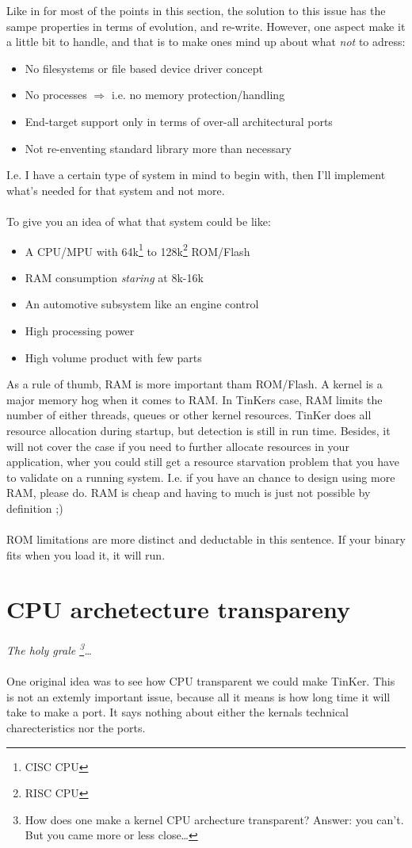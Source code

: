 Like in for most of the points in this section, the solution to this issue has the sampe properties in terms of evolution, and re-write. However, one aspect make it a little bit to handle, and that is to make ones mind up about what \textit{not} to adress:
\begin{itemize}
	\item No filesystems or file based device driver concept
	\item No processes $\Rightarrow$ i.e. no memory protection/handling
	\item End-target support only in terms of over-all architectural ports
	\item Not re-enventing standard library more than necessary
\end{itemize}
I.e. I have a certain type of system in mind to begin with, then I'll implement what's needed for that system and not more.
\\\\
To give you an idea of what that system could be like:
\begin{itemize}
	\item A CPU/MPU with 64k\footnote{CISC CPU} to 128k\footnote{RISC CPU} ROM/Flash
	\item RAM consumption \textit{staring} at 8k-16k
	\item An automotive subsystem like an engine control
	\item High processing power
	\item High volume product with few parts
\end{itemize}
As a rule of thumb, RAM is more important tham ROM/Flash. A kernel is a major memory hog when it comes to RAM. In TinKers case, RAM limits the number of either threads, queues or other kernel resources. TinKer does all resource allocation during startup, but detection is  still in run time. Besides, it will not cover the case if you need to further allocate resources in your application, wher you could still get a resource starvation problem that you have to validate on a running system. I.e. if you have an chance to design using more RAM, please do. RAM is cheap and having to much is just not possible by definition ;)
\\\\
ROM limitations are more distinct and deductable in this sentence. If your binary fits when you load it, it will run.


\chapter{CPU archetecture transpareny}
\textit{The holy grale \footnote{How does one make a kernel CPU archecture transparent? Answer: you can't. But you came more or less close\ldots}\ldots}\
\\\\
One original idea was to see how CPU transparent we could make TinKer. This is not an extemly important issue, because all it means is how long time it will take to make a port. It says nothing about either the kernals technical charecteristics nor the ports.

